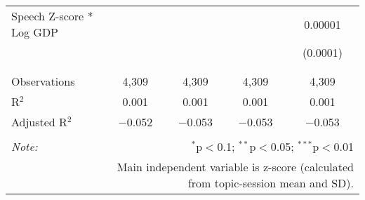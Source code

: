 \begin{table}[!htbp]
\begin{tabular}{@{\extracolsep{5pt}}lcccc}
 Speech Z-score * Log GDP &  &  &  & 0.00001 \\ 
  &  &  &  & (0.0001) \\ 
  & & & & \\ 
\hline \\[-1.8ex] 
Observations & 4,309 & 4,309 & 4,309 & 4,309 \\ 
R$^{2}$ & 0.001 & 0.001 & 0.001 & 0.001 \\ 
Adjusted R$^{2}$ & $-$0.052 & $-$0.053 & $-$0.053 & $-$0.053 \\ 
\hline 
\hline \\[-1.8ex] 
\textit{Note:}  & \multicolumn{4}{r}{$^{*}$p$<$0.1; $^{**}$p$<$0.05; $^{***}$p$<$0.01} \\ 
 & \multicolumn{4}{r}{Main independent variable is z-score (calculated from topic-session mean and SD).} \\ 
\end{tabular} 
\end{table} 
